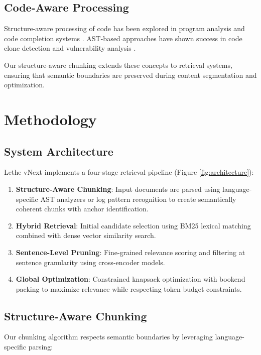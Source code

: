 \documentclass[conference]{IEEEtran}
\begin{document}
\subsection{Code-Aware Processing}

Structure-aware processing of code has been explored in program analysis \cite{allamanis2018learning} and code completion systems \cite{li2022competition}. AST-based approaches have shown success in code clone detection \cite{white2016deep} and vulnerability analysis \cite{li2018vuldeepecker}.

Our structure-aware chunking extends these concepts to retrieval systems, ensuring that semantic boundaries are preserved during content segmentation and optimization.

\section{Methodology}

\subsection{System Architecture}

Lethe vNext implements a four-stage retrieval pipeline (Figure \ref{fig:architecture}):

\begin{enumerate}
\item \textbf{Structure-Aware Chunking}: Input documents are parsed using language-specific AST analyzers or log pattern recognition to create semantically coherent chunks with anchor identification.
\item \textbf{Hybrid Retrieval}: Initial candidate selection using BM25 lexical matching combined with dense vector similarity search.
\item \textbf{Sentence-Level Pruning}: Fine-grained relevance scoring and filtering at sentence granularity using cross-encoder models.
\item \textbf{Global Optimization}: Constrained knapsack optimization with bookend packing to maximize relevance while respecting token budget constraints.
\end{enumerate}

\subsection{Structure-Aware Chunking}

Our chunking algorithm respects semantic boundaries by leveraging language-specific parsing:
\end{document}
